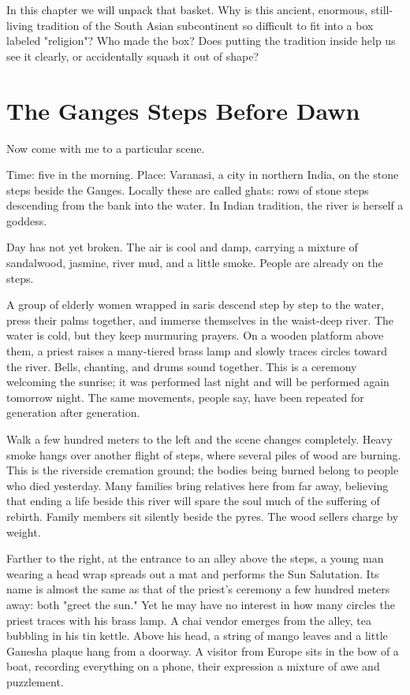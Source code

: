 In this chapter we will unpack that basket. Why is this ancient, enormous, still-living tradition of the South Asian subcontinent so difficult to fit into a box labeled "religion"? Who made the box? Does putting the tradition inside help us see it clearly, or accidentally squash it out of shape?

\section{The Ganges Steps Before Dawn}
Now come with me to a particular scene.

Time: five in the morning. Place: Varanasi, a city in northern India, on the stone steps beside the Ganges. Locally these are called ghats: rows of stone steps descending from the bank into the water. In Indian tradition, the river is herself a goddess.

Day has not yet broken. The air is cool and damp, carrying a mixture of sandalwood, jasmine, river mud, and a little smoke. People are already on the steps.

A group of elderly women wrapped in saris descend step by step to the water, press their palms together, and immerse themselves in the waist-deep river. The water is cold, but they keep murmuring prayers. On a wooden platform above them, a priest raises a many-tiered brass lamp and slowly traces circles toward the river. Bells, chanting, and drums sound together. This is a ceremony welcoming the sunrise; it was performed last night and will be performed again tomorrow night. The same movements, people say, have been repeated for generation after generation.

Walk a few hundred meters to the left and the scene changes completely. Heavy smoke hangs over another flight of steps, where several piles of wood are burning. This is the riverside cremation ground; the bodies being burned belong to people who died yesterday. Many families bring relatives here from far away, believing that ending a life beside this river will spare the soul much of the suffering of rebirth. Family members sit silently beside the pyres. The wood sellers charge by weight.

Farther to the right, at the entrance to an alley above the steps, a young man wearing a head wrap spreads out a mat and performs the Sun Salutation. Its name is almost the same as that of the priest's ceremony a few hundred meters away: both "greet the sun." Yet he may have no interest in how many circles the priest traces with his brass lamp. A chai vendor emerges from the alley, tea bubbling in his tin kettle. Above his head, a string of mango leaves and a little Ganesha plaque hang from a doorway. A visitor from Europe sits in the bow of a boat, recording everything on a phone, their expression a mixture of awe and puzzlement.

